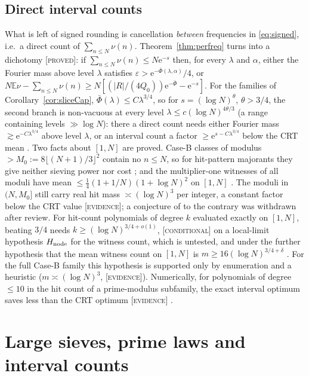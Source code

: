 \documentclass[10pt,reqno]{amsart}
\theoremstyle{definition}
\theoremstyle{remark}
\newcommand{\E}{\mathbb E}
\newcommand{\e}{\mathrm e}
\newcommand{\lab}[1]{\textup{[\textsc{#1}]}}
\begin{document}
\subsection{Direct interval counts}
What is left of signed rounding is cancellation \emph{between}
frequencies in \eqref{eq:signed}, i.e.\ a direct count of
$\sum_{n\leq N}\nu(n)$.  Theorem~\ref{thm:perfreq} turns into a dichotomy
\cite[Thm~8.1]{NC} \lab{proved}: if $\sum_{n\leq N}\nu(n)\leq N\e^{-s}$ then, for
every $\lambda$ and $\alpha$, either the Fourier mass above level $\lambda$ satisfies
$\varepsilon>\e^{-\bar\Phi(\lambda,\alpha)}/4$, or
$N\E\nu-\sum_{n\leq N}\nu(n)\geq N[(|R|/(4Q_0))\e^{-\bar\Phi}-\e^{-s}]$.  For the
families of Corollary~\ref{cor:sliceCap}, $\bar\Phi(\lambda)\leq C\lambda^{3/4}$, so for
$s=(\log N)^\theta$, $\theta>3/4$, the second branch is non-vacuous at every level
$\lambda\leq c(\log N)^{4\theta/3}$ (a range containing levels $\gg\log N$): there
a direct count needs either Fourier mass $\gtrsim\e^{-C\lambda^{3/4}}$ above level
$\lambda$, or an interval count a factor $\geq\e^{s-C\lambda^{3/4}}$ below the CRT
mean \cite[\S8.1]{NC}.  Two facts about $[1,N]$ are proved.  Case-B classes of modulus
$>M_0:=8\lfloor(N+1)/3\rfloor^2$ contain no $n\leq N$, so for hit-pattern
majorants they give neither sieving power nor cost \cite[Lemma~8.2,
Cor.~8.3]{NC}; and the multiplier-one witnesses of all moduli have mean
$\leq\frac14(1+1/N)(1+\log N)^2$ on $[1,N]$ \cite[Prop.~8.4]{NC}.  The moduli in
$(N,M_0]$ still carry real hit mass $\asymp(\log N)^3$ per integer, a
constant factor below the CRT value \lab{evidence}; a conjecture of
\cite{NC} to the contrary was withdrawn after review.  For hit-count
polynomials of degree $k$ evaluated exactly on $[1,N]$, beating $3/4$ needs
$k\geq(\log N)^{3/4+o(1)}$, \lab{conditional} on a local-limit hypothesis
$H_{\rm node}$ for the witness count, which is untested, and under the
further hypothesis that the mean witness count on $[1,N]$ is
$m\geq16(\log N)^{3/4+\delta}$ \cite[Prop.~8.6, Cor.~8.7]{NC}.  For the full
Case-B family this hypothesis is supported only by enumeration and a
heuristic ($m\asymp(\log N)^3$, \lab{evidence}).  Numerically, for polynomials of degree $\leq10$ in the hit
count of a prime-modulus subfamily, the exact interval optimum saves less
than the CRT optimum \lab{evidence} \cite[\S8.3]{NC}.

\section{Large sieves, prime laws and interval counts}\label{sec:LS}
\end{document}
